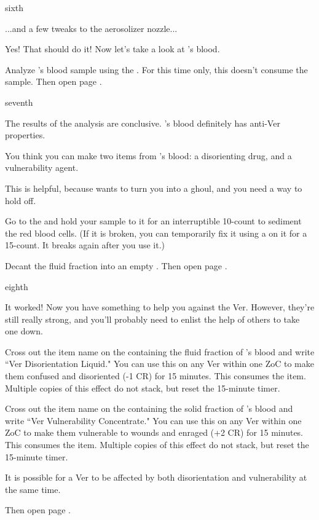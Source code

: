\documentclass[greennotebook]{guildcamp4} %
\begin{document}
\begin{page}{sixth}

...and a few tweaks to the aerosolizer nozzle...

Yes! That should do it! Now let's take a look at \cPlead{}'s blood.

Analyze \cPlead{}'s blood sample using the \sBloodAnalyzer{}. For this time only, this doesn't consume the sample. Then open page .

\end{page}

\begin{page}{seventh}

The results of the analysis are conclusive. \cPlead{}'s blood definitely has anti-Ver properties. 

You think you can make two items from \cPlead{}'s blood: a disorienting drug, and a vulnerability agent. 

This is helpful, because \cVone{} wants to turn you into a ghoul, and you need a way to hold  off.

Go to the \sCentrifuge{} and hold your sample to it for an interruptible 10-count to sediment the red blood cells. (If it is broken, you can temporarily fix it using a \iWrench{} on it for a 15-count. It breaks again after you use it.)

Decant the fluid fraction into an empty \iTestTube{}. Then open page .

\end{page}

\begin{page}{eighth}

It worked! Now you have something to help you against the Ver. However, they're still really strong, and you'll probably need to enlist the help of others to take one down.

Cross out the item name on the \iTestTube{} containing the fluid fraction of \cPlead{}'s blood and write ``Ver Disorientation Liquid." You can use this on any Ver within one ZoC to make them confused and disoriented (-1 CR) for 15 minutes. This consumes the item. Multiple copies of this effect do not stack, but reset the 15-minute timer.

Cross out the item name on the \iTestTube{} containing the solid fraction of \cPlead{}'s blood and write ``Ver Vulnerability Concentrate." You can use this on any Ver within one ZoC to make them vulnerable to wounds and enraged (+2 CR) for 15 minutes. This consumes the item. Multiple copies of this effect do not stack, but reset the 15-minute timer.

It is possible for a Ver to be affected by both disorientation and vulnerability at the same time.

Then open page .

\end{page}
\end{document}
